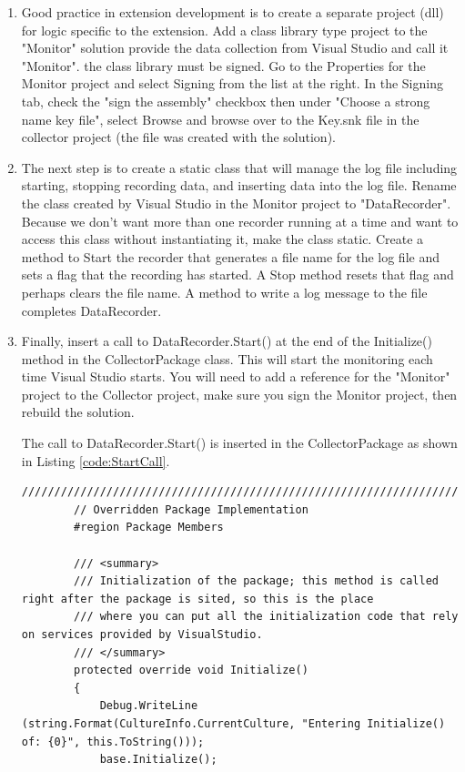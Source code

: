 \begin{enumerate}
\item
Good practice in extension development is to create a separate project (dll) for logic specific to the extension.  Add a class library type project to  the "Monitor" solution provide the data collection from Visual Studio and call it "Monitor".  the class library must be signed.  Go to the Properties for the Monitor project and select Signing from the list at the right.  In the Signing tab, check the "sign the assembly" checkbox then under "Choose a strong name key file", select Browse and browse over to the Key.snk file in the collector project (the file was created with the solution).
\item
The next step is to create a static class that will manage the log file including starting, stopping recording data, and inserting data into the log file.  Rename the class created by Visual Studio in the Monitor project to "DataRecorder".    Because we don't want more than one recorder running at a time and want to access this class without instantiating it, make the class static.  Create a method to Start the recorder that generates a file name for the log file and sets a flag that the recording has started. A Stop method resets that flag and perhaps clears the file name.  A method to write a log message to the file completes DataRecorder.
\item
Finally, insert a call to DataRecorder.Start() at the end of the Initialize() method in the CollectorPackage class.  This will start the monitoring each time Visual Studio starts.  You will need to add a reference for the "Monitor" project to the Collector project, make sure you sign the Monitor project, then rebuild the solution.


The call to DataRecorder.Start() is inserted in the CollectorPackage as shown in Listing \ref{code:StartCall}.
\begin{lstlisting}[caption=Call to DataRecorder.Start(),label=code:StartCall]
        /////////////////////////////////////////////////////////////////////////////
        // Overridden Package Implementation
        #region Package Members

        /// <summary>
        /// Initialization of the package; this method is called right after the package is sited, so this is the place
        /// where you can put all the initialization code that rely on services provided by VisualStudio.
        /// </summary>
        protected override void Initialize()
        {
            Debug.WriteLine (string.Format(CultureInfo.CurrentCulture, "Entering Initialize() of: {0}", this.ToString()));
            base.Initialize();


\end{lstlisting}
\end{enumerate}
